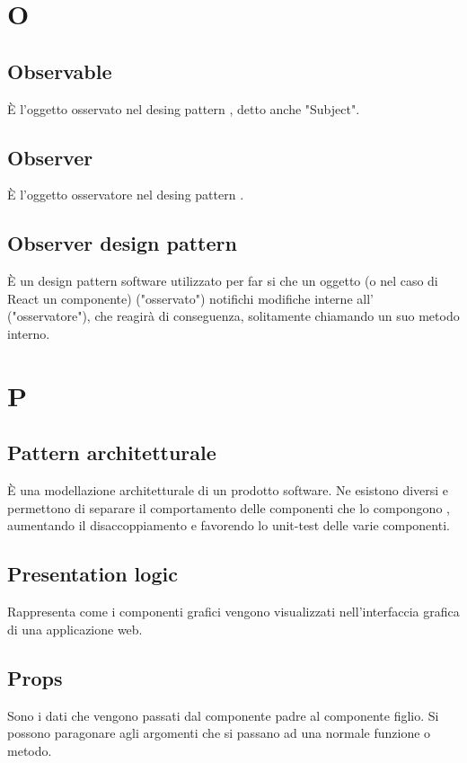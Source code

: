 \section*{O}
\subsection*{Observable}
È l'oggetto osservato nel desing pattern , detto anche "Subject". 
\subsection*{Observer}
È l'oggetto osservatore nel desing pattern .
\subsection*{Observer design pattern}
È un design pattern software utilizzato per far si che un oggetto (o nel caso di React un componente) ("osservato") notifichi modifiche interne all' ("osservatore"), che reagirà di conseguenza, solitamente chiamando un suo metodo interno.

\section*{P}
\subsection*{Pattern architetturale}
È una modellazione architetturale di un prodotto software. Ne esistono diversi e permettono di separare il comportamento delle componenti che lo compongono , aumentando il disaccoppiamento e favorendo lo unit-test delle varie componenti. 

\subsection*{Presentation logic}
Rappresenta come i componenti grafici vengono visualizzati nell'interfaccia grafica di una applicazione web.

\subsection*{Props}
Sono i dati che vengono passati dal componente padre al componente figlio. Si possono paragonare agli argomenti che si passano 
ad una normale funzione o metodo.
